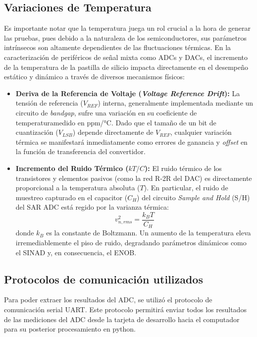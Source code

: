 \documentclass{article}
\begin{document}
\subsection{Variaciones de Temperatura}
Es importante notar que la temperatura juega un rol crucial a la hora de generar las pruebas, pues debido a la naturaleza de los semiconductores, sus parámetros intrínsecos son altamente dependientes de las fluctuaciones térmicas. En la caracterización de periféricos de señal mixta como ADCs y DACs, el incremento de la temperatura de la pastilla de silicio impacta directamente en el desempeño estático y dinámico a través de diversos mecanismos físicos:
\begin{itemize}
    \item \textbf{Deriva de la Referencia de Voltaje (\textit{Voltage Reference Drift}):} La tensión de referencia ($V_{REF}$) interna, generalmente implementada mediante un circuito de \textit{bandgap}, sufre una variación en su coeficiente de temperaturamedido en ppm/°C. Dado que el tamaño de un bit de cuantización ($V_{LSB}$) depende directamente de $V_{REF}$, cualquier variación térmica se manifestará inmediatamente como errores de ganancia y \textit{offset} en la función de transferencia del convertidor.
    \item \textbf{Incremento del Ruido Térmico ($kT/C$):} El ruido térmico de los transistores y elementos pasivos (como la red R-2R del DAC) es directamente proporcional a la temperatura absoluta ($T$). En particular, el ruido de muestreo capturado en el capacitor ($C_H$) del circuito \textit{Sample and Hold} (S/H) del SAR ADC está regido por la varianza térmica:
    \begin{equation}
        v_{n,rms}^2 = \frac{k_B T}{C_H}
    \end{equation}
    donde $k_B$ es la constante de Boltzmann. Un aumento de la temperatura eleva irremediablemente el piso de ruido, degradando parámetros dinámicos como el SINAD y, en consecuencia, el ENOB.
\end{itemize}
\subsection{Protocolos de comunicación utilizados}
Para poder extraer los resultados del ADC, se utilizó el protocolo de comunicación serial UART. Este protocolo permitirá enviar todos los resultados de las mediciones del ADC desde la tarjeta de desarrollo hacia el computador para su posterior procesamiento en python.
\end{document}

